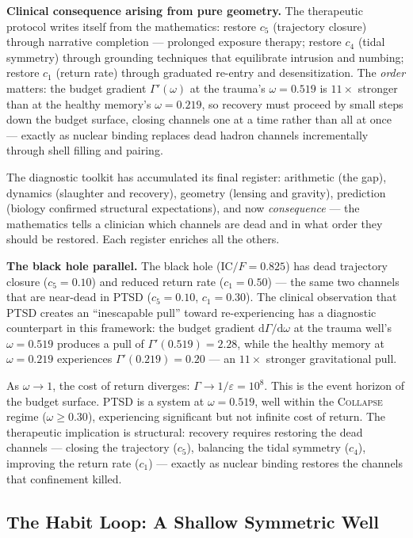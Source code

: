\documentclass[
  aps,
  prd,
  twocolumn,
  superscriptaddress,
  nofootinbib,
  floatfix
]{revtex4-2}
\newcommand{\Gam}{\Gamma}
\newcommand{\eps}{\varepsilon}
\newcommand{\dd}{\mathrm{d}}
\newcommand{\regime}[1]{\textsc{#1}}
\newcommand{\IC}{\mathrm{IC}}
\begin{document}
\textbf{Clinical consequence arising from pure geometry.}
The therapeutic protocol writes itself from the
mathematics: restore $c_5$ (trajectory closure) through
narrative completion --- prolonged exposure therapy;
restore $c_4$ (tidal symmetry) through grounding techniques
that equilibrate intrusion and numbing; restore $c_1$
(return rate) through graduated re-entry and
desensitization.  The \emph{order} matters: the budget
gradient $\Gam'(\omega)$ at the trauma's $\omega = 0.519$
is $11\times$ stronger than at the healthy memory's
$\omega = 0.219$, so recovery must proceed by small steps
down the budget surface, closing channels one at a time
rather than all at once --- exactly as nuclear binding
replaces dead hadron channels incrementally through shell
filling and pairing.

The diagnostic toolkit has accumulated its final register:
arithmetic (the gap), dynamics (slaughter and recovery),
geometry (lensing and gravity), prediction (biology confirmed
structural expectations), and now \emph{consequence} ---
the mathematics tells a clinician which channels are dead
and in what order they should be restored.  Each register
enriches all the others.

\textbf{The black hole parallel.}
The black hole ($\IC/F = 0.825$) has dead trajectory closure
($c_5 = 0.10$) and reduced return rate ($c_1 = 0.50$) ---
the same two channels that are near-dead in PTSD ($c_5 = 0.10$,
$c_1 = 0.30$).  The clinical observation that PTSD creates
an ``inescapable pull'' toward re-experiencing has a
diagnostic counterpart in this framework:
the budget gradient $\dd\Gam/\dd\omega$ at the trauma well's
$\omega = 0.519$ produces a pull of $\Gam'(0.519) = 2.28$,
while the healthy memory at $\omega = 0.219$ experiences
$\Gam'(0.219) = 0.20$ --- an $11\times$ stronger gravitational
pull.

As $\omega \to 1$, the cost of return diverges:
$\Gam \to 1/\eps = 10^8$.  This is the event horizon of the
budget surface.  PTSD is a system at $\omega = 0.519$, well
within the \regime{Collapse} regime ($\omega \geq 0.30$),
experiencing significant but not infinite cost of return.
The therapeutic implication is structural: recovery requires
restoring the dead channels --- closing the trajectory
($c_5$), balancing the tidal symmetry ($c_4$), improving
the return rate ($c_1$) --- exactly as nuclear binding
restores the channels that confinement killed.


\subsection{The Habit Loop: A Shallow Symmetric Well}
\end{document}
